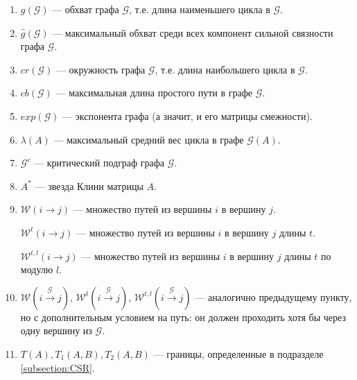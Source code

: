 \documentclass[12pt]{article}
\begin{document}
\begin{enumerate}
    \item $g(\mathcal{G})$ --- обхват графа $\mathcal{G}$, т.е. длина наименьшего цикла в $\mathcal{G}$.
    
    \item $\hat{g}(\mathcal{G})$ --- максимальный обхват среди всех компонент сильной связности графа $\mathcal{G}$.
    
    \item $cr(\mathcal{G})$ --- окружность графа $\mathcal{G}$, т.е. длина наибольшего цикла в $\mathcal{G}$.

	\item $cb(\mathcal{G})$ --- максимальная длина простого пути в графе $\mathcal{G}$.
    
    \item $exp(\mathcal{G})$ --- экспонента графа (а значит, и его матрицы смежности).
    
    \item $\lambda(A)$ --- максимальный средний вес цикла в графе $\mathcal{G}(A)$.
    
    \item $\mathcal{G}^c$ --- критический подграф графа $\mathcal{G}$.
    
    \item $A^*$ --- звезда Клини матрицы $A$.
    
    \item $\mathcal{W}(i \rightarrow j)$ --- множество путей из вершины $i$ в вершину $j$.
    
    $\mathcal{W}^t(i \rightarrow j)$ --- множество путей из вершины $i$ в вершину $j$ длины $t$.
    
    $\mathcal{W}^{t, l}(i \rightarrow j)$ --- множество путей из вершины $i$ в вершину $j$ длины $t$ по модулю $l$.
    
    \item $\mathcal{W}(i \xrightarrow{\mathcal{G}} j)$, $\mathcal{W}^t(i \xrightarrow{\mathcal{G}} j)$, $\mathcal{W}^{t, l}(i \xrightarrow{\mathcal{G}} j)$ --- аналогично предыдущему пункту, но с дополнительным условием на путь: он должен проходить хотя бы через одну вершину из $\mathcal{G}$.
    
    \item $T(A), T_1(A, B), T_2(A, B)$ --- границы, определенные в подразделе \ref{subsection:CSR}.
\end{enumerate}
\end{document}

